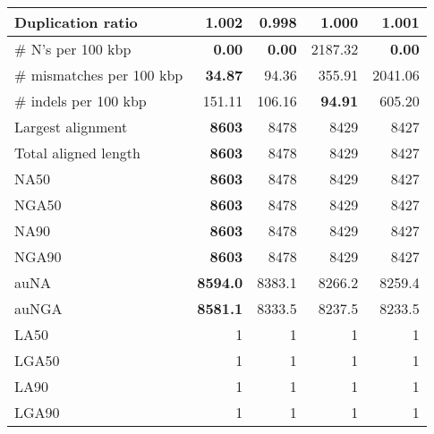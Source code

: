 \documentclass[12pt,a4paper]{article}
\begin{document}
\begin{table}[ht]
\begin{center}
\begin{tabular}{|l*{4}{|r}|}
Duplication ratio & 1.002 & {\bf 0.998} & 1.000 & 1.001 \\ \hline
\# N's per 100 kbp & {\bf 0.00} & {\bf 0.00} & 2187.32 & {\bf 0.00} \\ \hline
\# mismatches per 100 kbp & {\bf 34.87} & 94.36 & 355.91 & 2041.06 \\ \hline
\# indels per 100 kbp & 151.11 & 106.16 & {\bf 94.91} & 605.20 \\ \hline
Largest alignment & {\bf 8603} & 8478 & 8429 & 8427 \\ \hline
Total aligned length & {\bf 8603} & 8478 & 8429 & 8427 \\ \hline
NA50 & {\bf 8603} & 8478 & 8429 & 8427 \\ \hline
NGA50 & {\bf 8603} & 8478 & 8429 & 8427 \\ \hline
NA90 & {\bf 8603} & 8478 & 8429 & 8427 \\ \hline
NGA90 & {\bf 8603} & 8478 & 8429 & 8427 \\ \hline
auNA & {\bf 8594.0} & 8383.1 & 8266.2 & 8259.4 \\ \hline
auNGA & {\bf 8581.1} & 8333.5 & 8237.5 & 8233.5 \\ \hline
LA50 & 1 & 1 & 1 & 1 \\ \hline
LGA50 & 1 & 1 & 1 & 1 \\ \hline
LA90 & 1 & 1 & 1 & 1 \\ \hline
LGA90 & 1 & 1 & 1 & 1 \\ \hline
\end{tabular}
\end{center}
\end{table}
\end{document}
